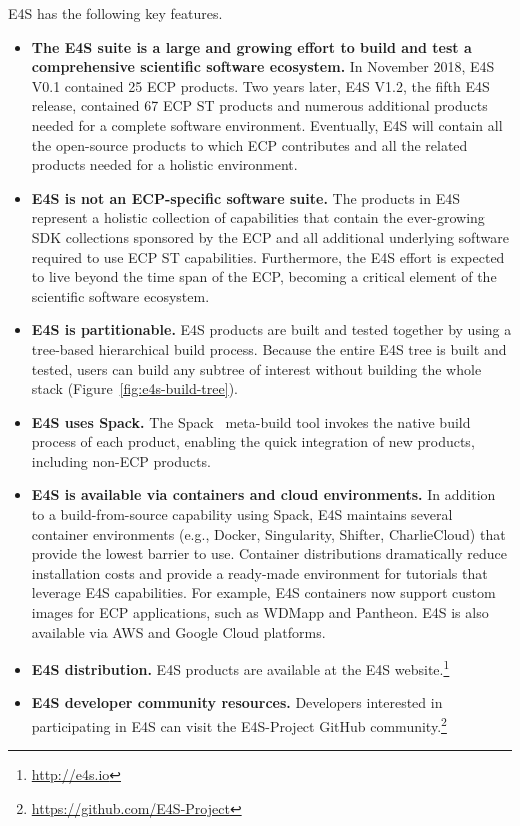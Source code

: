E4S has the following key features.
\begin{itemize}
	\item \textbf{The E4S suite is a large and growing effort to build and test a comprehensive scientific software ecosystem.} In November 2018, E4S V0.1 contained 25 ECP products.  Two years later, E4S V1.2, the fifth E4S release, contained 67 ECP ST products and numerous additional products needed for a complete software environment.  Eventually, E4S will contain all the open-source products to which ECP contributes and all the related products needed for a holistic environment.
	\item \textbf{E4S is not an ECP-specific software suite.}  The products in E4S represent a holistic collection of capabilities that contain the ever-growing SDK collections sponsored by the ECP and all additional underlying software required to use ECP ST capabilities.  Furthermore, the E4S effort is expected to live beyond the time span of the ECP, becoming a critical element of the scientific software ecosystem.
	\item \textbf{E4S is partitionable.} E4S products are built and tested together by using a tree-based hierarchical build process.  Because the entire E4S tree is built and tested, users can build any subtree of interest without building the whole stack (Figure~\ref{fig:e4s-build-tree}).
	\item \textbf{E4S uses Spack.} The Spack~\cite{gamblin+:ecp18-spack-tutorial} meta-build tool invokes the native build process of each product, enabling the quick integration of new products, including non-ECP products.
	\item \textbf{E4S is available via containers and cloud environments.} In addition to a build-from-source capability using Spack, E4S maintains several container environments (e.g., Docker, Singularity, Shifter, CharlieCloud) that provide the lowest barrier to use.  Container distributions dramatically reduce installation costs and provide a ready-made environment for tutorials that leverage E4S capabilities.  For example, E4S containers now support custom images for ECP applications, such as WDMapp and Pantheon.  E4S is also available via AWS and Google Cloud platforms.
	\item \textbf{E4S distribution.} E4S products are available at the E4S website.\footnote{\url{http://e4s.io}}
	\item \textbf{E4S developer community resources.} Developers interested in participating in E4S can visit the E4S-Project GitHub community.\footnote{\url{https://github.com/E4S-Project}}	
\end{itemize}

